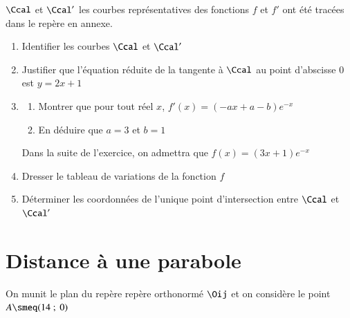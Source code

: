 \documentclass[oneside,12pt]{article}
\begin{document}
$\Ccal$ et $\Ccal'$ les courbes représentatives des fonctions $f$ et $f'$ ont été tracées dans le repère en annexe.
\begin{enumerate}
	\item Identifier les courbes $\Ccal$ et $\Ccal'$
	\item Justifier que l'équation réduite de la tangente à $\Ccal$ au point d'abscisse $0$ est $y=2x+1$
	\item \begin{enumerate}
		\item Montrer que pour tout réel $x$, $f'(x)=(-ax+a-b)e^{-x}$
		\item En déduire que $a=3$ et $b=1$
	\end{enumerate}
	Dans la suite de l'exercice, on admettra que $f(x)=(3x+1)e^{-x}$
	\item Dresser le tableau de variations de la fonction $f$
	\item Déterminer les coordonnées de l'unique point d'intersection entre $\Ccal$ et $\Ccal'$
\end{enumerate}

\vspace{1cm}

\begin{center}
\end{center}



\newpage
\section{Distance à une parabole}
On munit le plan du repère repère orthonormé $\Oij$ et on considère le point $A\smeq(14~;~0)$
\end{document}
